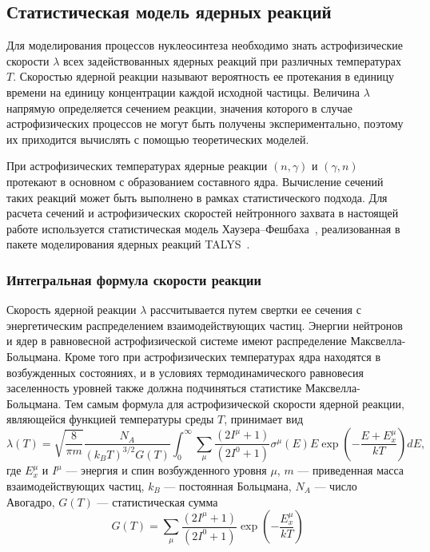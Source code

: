 \subsection{Статистическая модель ядерных реакций}
\label{sec:statmodel}
Для моделирования процессов нуклеосинтеза необходимо знать астрофизические скорости $\lambda$ всех задействованных ядерных реакций при различных температурах $T$. Скоростью ядерной реакции называют вероятность ее протекания в единицу времени на единицу концентрации каждой исходной частицы. Величина $\lambda$ напрямую определяется сечением реакции, значения которого в случае астрофизических процессов не могут быть получены экспериментально, поэтому их приходится вычислять с помощью теоретических моделей.

При астрофизических температурах ядерные реакции $(n,\gamma)$ и $(\gamma,n)$ протекают в основном с образованием составного ядра. Вычисление сечений таких реакций может быть выполнено в рамках статистического подхода. Для расчета сечений и астрофизических скоростей нейтронного захвата в настоящей работе используется статистическая модель Хаузера--Фешбаха~\cite{hauser1952}, реализованная в пакете моделирования ядерных реакций TALYS~\cite{koning2019}.

\subsubsection{Интегральная формула скорости реакции}
Скорость ядерной реакции $\lambda$ рассчитывается путем свертки ее сечения с энергетическим распределением взаимодействующих частиц. Энергии нейтронов и ядер в равновесной астрофизической системе имеют распределение Максвелла-Больцмана. Кроме того при астрофизических температурах ядра находятся в возбужденных состояниях, и в условиях термодинамического равновесия заселенность уровней также должна подчиняться статистике Максвелла-Больцмана. Тем самым формула для астрофизической скорости ядерной реакции, являющейся функцией температуры среды $T$, принимает вид
\begin{equation}
\displaystyle
\lambda(T) = \sqrt{\frac{8}{\pi m}} \frac{N_A}{(k_B T)^{3/2} G(T)} \int_0^\infty \sum_\mu \frac{(2 I^\mu + 1)}{(2 I^0 + 1)} \sigma^\mu(E) E \exp \left( - \frac{E + E_x^\mu}{kT} \right) dE,
\label{eq:rate}
\end{equation}
где $E^\mu_x$ и $I^\mu$ --- энергия и спин возбужденного уровня $\mu$, $m$ --- приведенная масса взаимодействующих частиц, $k_B$ --- постоянная Больцмана, $N_A$ --- число Авогадро, $G(T)$ --- статистическая сумма
\begin{equation}
    \displaystyle
    G(T) = \sum_\mu \frac{(2 I^\mu + 1)}{(2 I^0 + 1)} \exp \left( - \frac{E_x^\mu}{kT} \right)
\end{equation}

